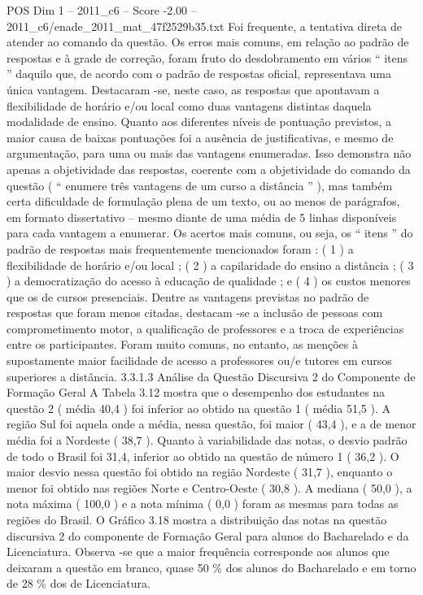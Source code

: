 \begin{textsample}{POS Dim 1 – 2011\_c6 – Score -2.00 – 2011\_c6/enade\_2011\_mat\_47f2529b35.txt}
Foi frequente, a tentativa direta de atender ao comando da questão.
Os erros mais comuns, em relação ao padrão de respostas e à grade de correção, foram fruto do desdobramento em vários “ itens ” daquilo que, de acordo com o padrão de respostas oficial, representava uma única vantagem.
Destacaram -se, neste caso, as respostas que apontavam a flexibilidade de horário e/ou local como duas vantagens distintas daquela modalidade de ensino.
Quanto aos diferentes níveis de pontuação previstos, a maior causa de baixas pontuações foi a ausência de justificativas, e mesmo de argumentação, para uma ou mais das vantagens enumeradas.
Isso demonstra não apenas a objetividade das respostas, coerente com a objetividade do comando da questão ( “ enumere três vantagens de um curso a distância ” ), mas também certa dificuldade de formulação plena de um texto, ou ao menos de parágrafos, em formato dissertativo – mesmo diante de uma média de 5 linhas disponíveis para cada vantagem a enumerar.
Os acertos mais comuns, ou seja, os “ itens ” do padrão de respostas mais frequentemente mencionados foram : ( 1 ) a flexibilidade de horário e/ou local ; ( 2 ) a capilaridade do ensino a distância ; ( 3 ) a democratização do acesso à educação de qualidade ; e ( 4 ) os custos menores que os de cursos presenciais.
Dentre as vantagens previstas no padrão de respostas que foram menos citadas, destacam -se a inclusão de pessoas com comprometimento motor, a qualificação de professores e a troca de experiências entre os participantes.
Foram muito comuns, no entanto, as menções à supostamente maior facilidade de acesso a professores ou/e tutores em cursos superiores a distância. 3.3.1.3 Análise da Questão Discursiva 2 do Componente de Formação Geral A Tabela 3.12 mostra que o desempenho dos estudantes na questão 2 ( média 40,4 ) foi inferior ao obtido na questão 1 ( média 51,5 ).
A região Sul foi aquela onde a média, nessa questão, foi maior ( 43,4 ), e a de menor média foi a Nordeste ( 38,7 ).
Quanto à variabilidade das notas, o desvio padrão de todo o Brasil foi 31,4, inferior ao obtido na questão de número 1 ( 36,2 ).
O maior desvio nessa questão foi obtido na região Nordeste ( 31,7 ), enquanto o menor foi obtido nas regiões Norte e Centro-Oeste ( 30,8 ).
A mediana ( 50,0 ), a nota máxima ( 100,0 ) e a nota mínima ( 0,0 ) foram as mesmas para todas as regiões do Brasil.
O Gráfico 3.18 mostra a distribuição das notas na questão discursiva 2 do componente de Formação Geral para alunos do Bacharelado e da Licenciatura.
Observa -se que a maior frequência corresponde aos alunos que deixaram a questão em branco, quase 50 \% dos alunos do Bacharelado e em torno de 28 \% dos de Licenciatura.

\end{textsample}
